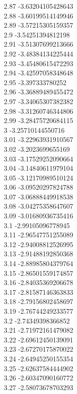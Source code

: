 {2.87	-3.63204105428643\\
2.88	-3.60199514149946\\
2.89	-3.57215305159357\\
2.9	-3.54251394812198\\
2.91	-3.51307699213666\\
2.92	-3.48384134225444\\
2.93	-3.45480615472293\\
2.94	-3.42597058348648\\
2.95	-3.397333780252\\
2.96	-3.36889489455472\\
2.97	-3.34065307382382\\
2.98	-3.31260746344806\\
2.99	-3.28475720684115\\
3	-3.25710144550716\\
3.01	-3.22963931910567\\
3.02	-3.2023699655169\\
3.03	-3.17529252090664\\
3.04	-3.14840611979104\\
3.05	-3.12170989510124\\
3.06	-3.09520297824788\\
3.07	-3.06888449918538\\
3.08	-3.04275358647607\\
3.09	-3.01680936735416\\
3.1	-2.99105096778945\\
3.11	-2.96547751255089\\
3.12	-2.94008812526995\\
3.13	-2.91488192850368\\
3.14	-2.88985804379764\\
3.15	-2.86501559174857\\
3.16	-2.84035369206678\\
3.17	-2.81587146363833\\
3.18	-2.79156802458697\\
3.19	-2.76744249233577\\
3.2	-2.74349398366852\\
3.21	-2.71972161479082\\
3.22	-2.69612450139091\\
3.23	-2.67270175870022\\
3.24	-2.64945250155354\\
3.25	-2.62637584444902\\
3.26	-2.60347090160772\\
3.27	-2.58073678703293\\
}
